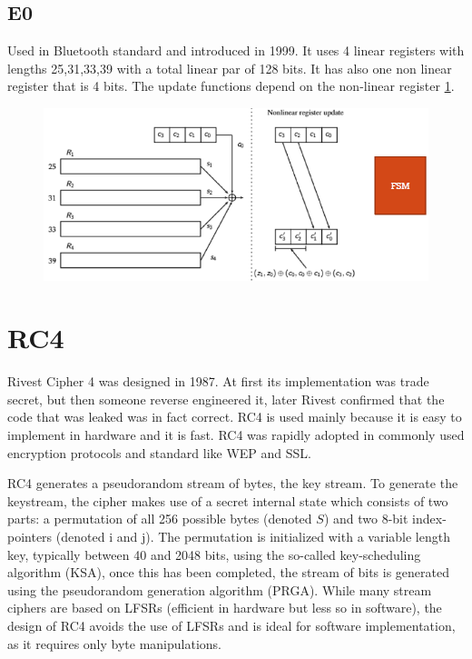 \subsection{E0}

Used in Bluetooth standard and introduced in 1999. It uses 4 linear registers with lengths 25,31,33,39 with a total linear par of 128 bits. It has also one non linear register that is 4 bits. The update functions depend on the non-linear register \ref{fig:e0}.

\begin{figure}
	\centering
	\includegraphics[width=0.7\linewidth]{Images/Chapter2/e0}
	\caption{}
	\label{fig:e0}
\end{figure}

\section{RC4}

Rivest Cipher 4 was designed in 1987. At first its implementation was trade secret, but then someone reverse engineered it, later Rivest confirmed that the code that was leaked was in fact correct. RC4 is used mainly because it is easy to implement in hardware and it is fast. RC4 was rapidly adopted in commonly used encryption protocols and standard like WEP and SSL.

RC4 generates a pseudorandom stream of bytes, the key stream. To generate the keystream, the cipher makes use of a secret internal state which consists of two parts: a permutation of all 256 possible bytes (denoted $S$) and two 8-bit index-pointers (denoted i and j). The permutation is initialized with a variable length key, typically between 40 and 2048 bits, using the so-called key-scheduling algorithm (KSA), once this has been completed, the stream of bits is generated using the pseudorandom generation algorithm (PRGA). While many stream ciphers are based on LFSRs (efficient in hardware but less so in software), the design of RC4 avoids the use of LFSRs and is ideal for software implementation, as it requires only byte manipulations.

